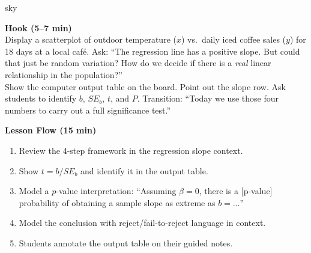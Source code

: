 \documentclass[10pt]{article}
\begin{document}
\begin{skillbox}{sky}
\begin{minipage}[t]{0.48\linewidth}
    \textbf{Hook (5--7 min)}\\
    Display a scatterplot of outdoor temperature ($x$) vs.\ daily iced coffee sales
    ($y$) for 18 days at a local café. Ask: ``The regression line has a positive slope.
    But could that just be random variation? How do we decide if there is a \emph{real}
    linear relationship in the population?''\\[4pt]
    Show the computer output table on the board. Point out the slope row. Ask students
    to identify $b$, $SE_b$, $t$, and $P$. Transition: ``Today we use those four
    numbers to carry out a full significance test.''
\end{minipage}
\hfill
\begin{minipage}[t]{0.48\linewidth}
    \textbf{Lesson Flow (15 min)}
    \begin{enumerate}
        \item Review the 4-step framework in the regression slope context.
        \item Show $t = b / SE_b$ and identify it in the output table.
        \item Model a $p$-value interpretation: ``Assuming $\beta = 0$, there is a
              [p-value] probability of obtaining a sample slope as extreme as $b = \ldots$''
        \item Model the conclusion with reject/fail-to-reject language in context.
        \item Students annotate the output table on their guided notes.
    \end{enumerate}
\end{minipage}
\end{skillbox}
\end{document}
